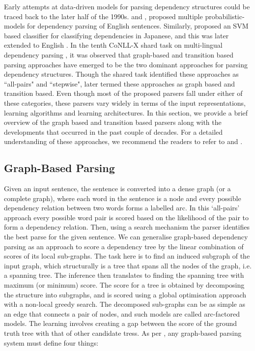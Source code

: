 \documentclass[11pt]{article}
\begin{document}
Early attempts at data-driven models for parsing dependency structures could be traced back to the later half of the 1990s.  and , proposed multiple probabilistic-models for dependency parsing of English sentences.  Similarly,  proposed an SVM based classifier for classifying dependencies in Japanese, and this was later extended to English \cite{yamada-matsumoto-2003-statistical}. In the tenth CoNLL-X shard task on  multi-lingual dependency parsing \cite{buchholz-marsi-2006-conll}, it was observed that graph-based and transition based parsing approaches have emerged to be the two dominant approaches for parsing dependency structures. Though the shared task identified these approaches as ``all-pairs" and ``stepwise",  later termed these approaches as graph based and transition based. Even though most of the proposed parsers fall under either of these categories,  these parsers vary widely in terms of the input representations, learning algorithms and learning architectures. In this section, we provide a brief overview of the graph based and transition based parsers along with the developments that occurred in the past couple of decades. For a detailed understanding of these approaches, we recommend the readers to refer to  and .


\subsection{Graph-Based Parsing}

Given an input sentence, the sentence is converted into a dense graph (or a complete graph), where each word in the sentence is a node and every possible dependency relation between two words forms a labelled arc. In this `all-pairs' approach \cite{buchholz-marsi-2006-conll} every possible word pair is scored based on the likelihood of the pair to form a dependency relation. Then, using a search mechanism the parser identifies the best parse for the given sentence. We can generalise graph-based dependency parsing as an approach to score a dependency tree by the linear combination of scores of its local sub-graphs. The task here is to find an induced subgraph of the input graph, which structurally is a tree that spans all the nodes of the graph, i.e. a  spanning tree. The inference then translates to finding the spanning tree with maximum (or minimum) score. The score for a tree is obtained by decomposing the structure into subgraphs, and is scored using a  global optimisation approach with a non-local greedy search. The decomposed sub-graphs can be as simple as an edge that connects a pair of nodes, and such models are called arc-factored models. The learning involves creating a gap between the score of the ground truth tree with that of other candidate tress. As per , any graph-based parsing system must define four things:
\end{document}
